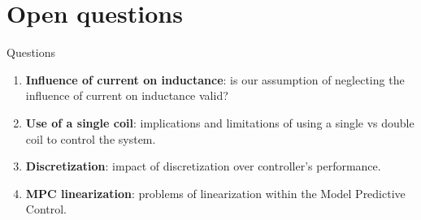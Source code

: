\section{Open questions}

\begin{frame}{Questions}

    \begin{enumerate}
        \item \textbf{Influence of current on inductance}: is our assumption of neglecting the influence of current on inductance valid?
        \item \textbf{Use of a single coil}: implications and limitations of using a single vs double coil to control the system.
        \item \textbf{Discretization}: impact of discretization over controller's performance.
        \item \textbf{MPC linearization}: problems of linearization within the Model Predictive Control.
    \end{enumerate}

\end{frame}